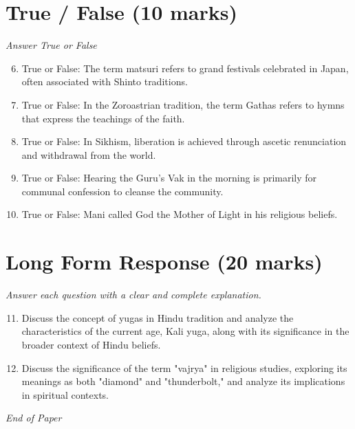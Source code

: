 \documentclass[12pt]{article}
\begin{document}
\section*{True / False (10 marks)}
\textit{Answer True or False}
\begin{enumerate}[label=\arabic*.]
\setcounter{enumi}{5}
\item True or False: The term matsuri refers to grand festivals celebrated in Japan, often associated with Shinto traditions.
\item True or False: In the Zoroastrian tradition, the term Gathas refers to hymns that express the teachings of the faith.
\item True or False: In Sikhism, liberation is achieved through ascetic renunciation and withdrawal from the world.
\item True or False: Hearing the Guru's Vak in the morning is primarily for communal confession to cleanse the community.
\item True or False: Mani called God the Mother of Light in his religious beliefs.
\end{enumerate}

\section*{Long Form Response (20 marks)}
\textit{Answer each question with a clear and complete explanation.}
\begin{enumerate}[label=\arabic*.]
\setcounter{enumi}{10}
\item Discuss the concept of yugas in Hindu tradition and analyze the characteristics of the current age, Kali yuga, along with its significance in the broader context of Hindu beliefs.
\item Discuss the significance of the term "vajrya" in religious studies, exploring its meanings as both "diamond" and "thunderbolt," and analyze its implications in spiritual contexts.
\end{enumerate}

\vfill
\noindent\textit{End of Paper}
\end{document}
